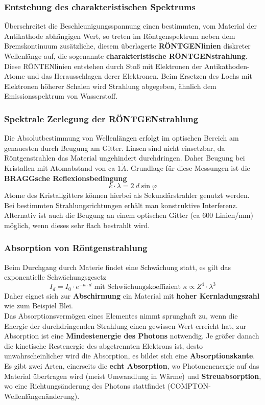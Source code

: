 \documentclass[12pt,a4paper,ngerman]{article}
\begin{document}
\subsubsection*{Entstehung des charakteristischen Spektrums}
Überschreitet die Beschleunigungsspannung einen bestimmten, vom Material der Antikathode abhängigen Wert, so treten im Röntgenspektrum neben dem Bremskontinuum zusätzliche, diesem überlagerte \textbf{RÖNTGENlinien} diskreter Wellenlänge auf, die sogenannte \textbf{charakteristische RÖNTGENstrahlung}. Diese RÖNTENlinien entstehen durch Stoß mit Elektronen der Antikathoden-Atome und das Herausschlagen derer Elektronen. Beim Ersetzen des Lochs mit Elektronen höherer Schalen wird Strahlung abgegeben, ähnlich dem Emissionsspektrum von Wasserstoff. 

\subsubsection*{Spektrale Zerlegung der RÖNTGENstrahlung}
Die Absolutbestimmung von Wellenlängen erfolgt im optischen Bereich am genauesten durch Beugung am Gitter. Linsen sind nicht einsetzbar, da Röntgenstrahlen das Material ungehindert durchdringen. Daher Beugung bei Kristallen mit Atomabstand von ca $1 \mathring{A}$. Grundlage für diese Messungen ist die \textbf{BRAGGsche Reflexionsbedingung}
\begin{equation}
k \cdot \lambda = 2 \ d \sin \varphi
\end{equation}
Atome des Kristallgitters können hierbei als Sekundärstrahler genutzt werden. Bei bestimmten Strahlungsrichtungen erhält man konstruktive Interferenz. 
Alternativ ist auch die Beugung an einem optischen Gitter (ca 600 Linien/mm) möglich, wenn dieses sehr flach bestrahlt wird. 

\subsubsection*{Absorption von Röntgenstrahlung}
Beim Durchgang durch Materie findet eine Schwächung statt, es gilt das exponentielle Schwächungsgesetz
\begin{equation}
I_d = I_0 \cdot e^{-\kappa \cdot d} \text{ mit Schwächungskoeffizient } \kappa \propto Z^4 \cdot \lambda^3
\end{equation}
Daher eignet sich zur \textbf{Abschirmung} ein Material mit \textbf{hoher Kernladungszahl} wie zum Beispiel Blei. \\
Das Absorptionsvermögen eines Elementes nimmt sprunghaft zu, wenn die Energie der durchdringenden Strahlung einen gewissen Wert erreicht hat, zur Absorption ist eine \textbf{Mindestenergie des Photons} notwendig. Je größer danach die kinetische Restenergie des abgetrennten Elektrons ist, desto unwahrscheinlicher wird die Absorption, es bildet sich eine \textbf{Absorptionskante}. 
Es gibt zwei Arten, einerseits die \textbf{echt Absorption}, wo Photonenenergie auf das Material übertragen wird (meist Umwandlung in Wärme) und \textbf{Streuabsorption}, wo eine Richtungsänderung des Photons stattfindet (COMPTON-Wellenlängenänderung). 
\end{document}
